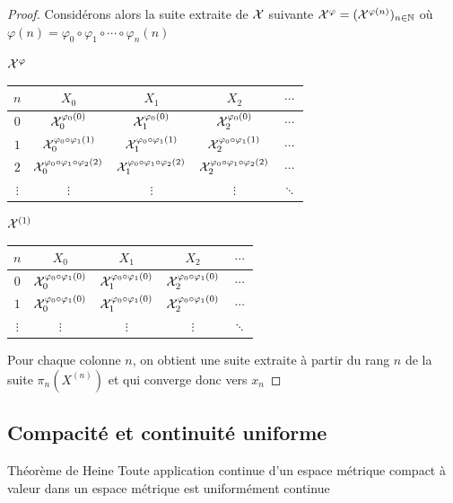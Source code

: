 \documentclass[]{report}
\begin{document}
\begin{proof}
        Considérons alors la suite extraite de $\mathcal{X}$ suivante $\mathcal{X}^{\varphi}=(\mathcal{X}^{\varphi(n)})_{n\in\mathbb{N}}$ où $\varphi(n)=\varphi_0\circ\varphi_1\circ\cdots\circ \varphi_n(n)$
        \begin{center}
            $\mathcal{X}^{\varphi}$
            \begin{tabular}{c|cccc}
                $n$&$X_0$&$X_1$&$X_2$&$\cdots$\\ \hline
                $0$&$\mathcal{X}_0^{\varphi_0(0)}$&$\mathcal{X}_1^{\varphi_0(0)}$&$\mathcal{X}_2^{\varphi_0(0)}$&$\cdots$\\
                $1$&$\mathcal{X}_0^{\varphi_0\circ\varphi_1(1)}$&$\mathcal{X}_1^{\varphi_0\circ\varphi_1(1)}$&$\mathcal{X}_2^{\varphi_0\circ\varphi_1(1)}$&$\cdots$\\
                $2$&$\mathcal{X}_0^{\varphi_0\circ\varphi_1\circ \varphi_2(2)}$&$\mathcal{X}_1^{\varphi_0\circ\varphi_1\circ \varphi_2(2)}$&$\mathcal{X}_2^{\varphi_0\circ\varphi_1\circ \varphi_2(2)}$&$\cdots$\\
                $\vdots$&$\vdots$&$\vdots$&$\vdots$&$\ddots$
            \end{tabular}
            \qquad
            $\mathcal{X}^{(1)}$
            \begin{tabular}{c|cccc}
                $n$&$X_0$&$X_1$&$X_2$&$\cdots$\\ \hline
                $0$&$\mathcal{X}_0^{\varphi_0\circ\varphi_1(0)}$&$\mathcal{X}_1^{\varphi_0\circ\varphi_1(0)}$&$\mathcal{X}_2^{\varphi_0\circ\varphi_1(0)}$&$\cdots$\\
                $1$&$\mathcal{X}_0^{\varphi_0\circ\varphi_1(0)}$&$\mathcal{X}_1^{\varphi_0\circ\varphi_1(0)}$&$\mathcal{X}_2^{\varphi_0\circ\varphi_1(0)}$&$\cdots$\\
                $\vdots$&$\vdots$&$\vdots$&$\vdots$&$\ddots$
            \end{tabular}
        \end{center}
        Pour chaque colonne $n$, on obtient une suite extraite à partir du rang $n$ de la suite $\pi_n(X^{(n)})$ et qui converge donc vers $x_n$
    \end{proof}

    \subsection*{Compacité et continuité uniforme}

    \begin{tm}{Théorème de Heine}{}
        Toute application continue d'un espace métrique compact à valeur dans un espace métrique est uniformément continue
    \end{tm}
\end{document}
